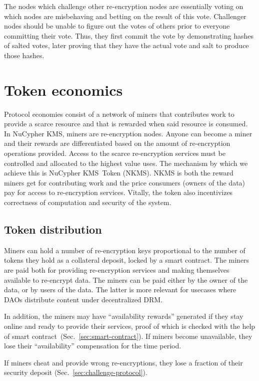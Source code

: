 \documentclass[longbibliography,nofootinbib]{revtex4-1}
\newcommand{\kms}{NuCypher KMS}
\begin{document}
\begin{CJK*}{UTF8}{gbsn}
The nodes which challenge other re-encryption nodes are essentially voting on which nodes are misbehaving and betting on the result of this vote.
Challenger nodes should be unable to figure out the votes of others prior to everyone committing their vote.
Thus, they first commit the vote by demonstrating hashes of salted votes, later proving that they have the actual vote and salt to produce those hashes.

\section{Token economics}
\label{sec:token}

Protocol economies consist of a network of miners that contributes work to provide a scarce resource and that is
rewarded when said resource is consumed.
In \kms, miners are re-encryption nodes.
Anyone can become a miner and their rewards are differentiated based on the amount of re-encryption operations provided.
Access to the scarce re-encryption services must be controlled and allocated to the highest value uses.
The mechanism by which we achieve this is \kms~Token (NKMS).
NKMS is both the reward miners get for contributing work and the price consumers (owners of the data) pay for access to re-encryption services.
Vitally, the token also incentivizes correctness of computation and security of the system.

\subsection{Token distribution}

Miners can hold a number of re-encryption keys proportional to the number of tokens they hold as a collateral deposit, locked by a smart contract.
The miners are paid both for providing re-encryption services and making themselves available to re-encrypt data.
The miners can be paid either by the owner of the data, or by users of the data.
The latter is more relevant for usecases where DAOs distribute content under decentralized DRM.

In addition, the miners may have ``availability rewards'' generated if they stay online and ready to provide their services, proof of which is checked with the help of
smart contract~(Sec.~\ref{sec:smart-contract}).
If miners become unavailable, they lose their ``availability'' compensation for the time period.

If miners cheat and provide wrong re-encryptions, they lose a fraction of their security deposit (Sec.~\ref{sec:challenge-protocol}).


\end{CJK*}
\end{document}
